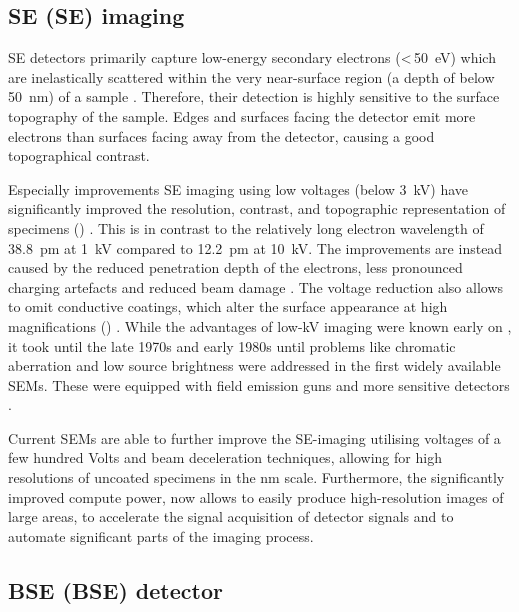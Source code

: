 \subsection{\Acl*{SE} (\acs*{SE}) imaging}
\label{sec:se}

\ac{SE} detectors primarily capture low-energy secondary electrons (<\,\qty{50}{\electronvolt}) which are inelastically scattered within the very near-surface region (a depth of below \qty{50}{\nano\meter}) of a sample \cite{pawley.1984}. %
Therefore, their detection is highly sensitive to the surface topography of the sample.
Edges and surfaces facing the detector emit more electrons than surfaces facing away from the detector, causing a good topographical contrast.

Especially improvements \ac{SE} imaging using low voltages (below \qty{3}{\kilo\volt}) have significantly improved the resolution, contrast, and topographic representation of specimens () \cite{pawley.1984,moser.1998}.
This is in contrast to the relatively long electron wavelength of \qty{38.8}{\pico\meter} at \qty{1}{\kilo\volt} compared to \qty{12.2}{\pico\meter} at \qty{10}{\kilo\volt}.
The improvements are instead caused by the reduced penetration depth of the electrons, less pronounced charging artefacts and reduced beam damage \cite{pawley.1984}.
The voltage reduction also allows to omit conductive coatings, which alter the surface appearance at high magnifications () \cite{pawley.1984,moser.1996}.
While the advantages of low-\unit{\kilo\volt} imaging were known early on \cite{vonardenne.1940}, it took until the late 1970s and early 1980s until problems like chromatic aberration and low source brightness were addressed in the first widely available \ac{SEM}s.
These were equipped with field emission guns and more sensitive detectors \cite{pawley.1984,moser.1996}.

Current \ac{SEM}s are able to further improve the \ac{SE}-imaging utilising voltages of a few hundred Volts and beam deceleration techniques, allowing for high resolutions of uncoated specimens in the \unit{\nano\meter} scale.
Furthermore, the significantly improved compute power, now allows to easily produce high-resolution images of large areas, to accelerate the signal acquisition of detector signals and to automate significant parts of the imaging process.

\subsection{\Acl*{BSE} (\acs*{BSE}) detector}
\label{sec:bse}

